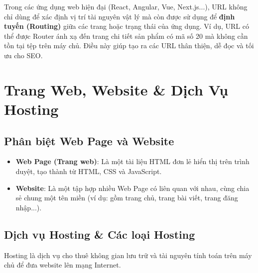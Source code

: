 \begin{noteBox}
Trong các ứng dụng web hiện đại (React, Angular, Vue, Next.js...), URL không chỉ dùng để xác định vị trí tài nguyên vật lý mà còn được sử dụng để \textbf{định tuyến (Routing)} giữa các trang hoặc trạng thái của ứng dụng. Ví dụ, URL  có thể được Router ánh xạ đến trang chi tiết sản phẩm có mã số 20 mà không cần tồn tại tệp  trên máy chủ. Điều này giúp tạo ra các URL thân thiện, dễ đọc và tối ưu cho SEO.
\end{noteBox}

\section{Trang Web, Website \& Dịch Vụ Hosting}
\label{sec:hosting}

\subsection{Phân biệt Web Page và Website}
\begin{itemize}
    \item \textbf{Web Page (Trang web)}: Là một tài liệu HTML đơn lẻ hiển thị trên trình duyệt, tạo thành từ HTML, CSS và JavaScript.
    \item \textbf{Website}: Là một tập hợp nhiều Web Page có liên quan với nhau, cùng chia sẻ chung một tên miền (ví dụ:  gồm trang chủ, trang bài viết, trang đăng nhập...).
\end{itemize}

\subsection{Dịch vụ Hosting \& Các loại Hosting}

Hosting là dịch vụ cho thuê không gian lưu trữ và tài nguyên tính toán trên máy chủ để đưa website lên mạng Internet.


